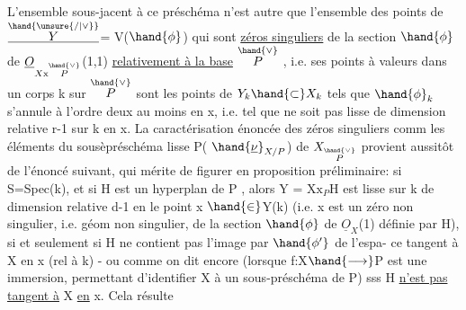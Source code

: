 
L'ensemble sous-jacent à ce préschéma n'est autre que l'ensemble des
points de $\underline{\overset{\hand{\unsure{/|\vee}}}{Y}}$= V($\hand{\phi}$) qui sont \uline{zéros singuliers} de la section $\hand{\phi}$ de
$\underline{O}_{X\mathrm{x}\overset{\hand{\vee}}{P}}$(1,1) \uline{relativement à la base} $\overset{\hand{\vee}}{P}$ , i.e. ses points  à valeurs dans
un corps k sur $\overset{\hand{\vee}}{P}$ sont les points  de $Y_k\hand{\subset} X_k$ tels que 
 $\hand{\phi}_k$ s'annule à l'ordre deux au moins
en x, i.e. tel que  ne soit pas lisse de dimension relative r-1
sur k en x. La caractérisation énoncée des  zéros singuliers comm
les éléments du sousèpréschéma lisse P( $\hand{\underline{\nu}}_{X/P}$) de $X_{\overset{\hand{\vee}}{P}}$ provient aussitôt
de l'énoncé suivant, qui mérite de figurer en proposition préliminaire:
si S=Spec(k), et si H est un hyperplan de P , alors Y = X$\mathrm{x}_P$H est
 lisse sur k de
dimension relative d-1 en le point x $\hand{\in}$Y(k) (i.e. x est un zéro non
singulier, i.e. géom non singulier, de la section $\hand{\phi}$ de $\underline{O}_X$(1) définie
par H), si et seulement si H ne contient pas l'image par $\hand{\phi'}$ de l'espa-%
ce tangent à X en x (rel à k) - ou  comme on dit encore
(lorsque f:X$\hand{\longrightarrow}$P est une immersion, permettant d'identifier X à un
sous-préschéma de P) sss H \uline{n'est pas tangent à} X \uline{en} x. Cela résulte
